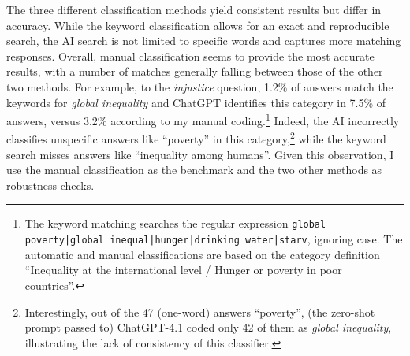 \documentclass[12pt,english]{article}
\makeatletter
\providecommand{\DIFaddtex}[1]{{\protect\color{blue}\uwave{#1}}} %
\providecommand{\DIFdeltex}[1]{{\protect\color{red}\sout{#1}}} %
\providecommand{\DIFaddbegin}{} %
\providecommand{\DIFaddend}{} %
\providecommand{\DIFdelbegin}{} %
\providecommand{\DIFdelend}{} %
\providecommand{\DIFadd}[1]{\texorpdfstring{\DIFaddtex{#1}}{#1}} %
\providecommand{\DIFdel}[1]{\texorpdfstring{\DIFdeltex{#1}}{}} %
\providecommand{\DIFscaledelfig}{0.5}
\newlength{\DIFdelgraphicswidth} %
\newlength{\DIFdelgraphicsheight} %
\providecommand{\DIFaddincludegraphics}[2][]{{\color{blue}\fbox{\DIFOincludegraphics[#1]{#2}}}} %
\providecommand{\DIFdelincludegraphics}[2][]{%
\sbox{\DIFdelgraphicsbox}{\DIFOincludegraphics[#1]{#2}}%
\settoboxwidth{\DIFdelgraphicswidth}{\DIFdelgraphicsbox} %
\settoboxtotalheight{\DIFdelgraphicsheight}{\DIFdelgraphicsbox} %
\scalebox{\DIFscaledelfig}{%
\parbox[b]{\DIFdelgraphicswidth}{\usebox{\DIFdelgraphicsbox}\\[-\baselineskip] \rule{\DIFdelgraphicswidth}{0em}}\llap{\resizebox{\DIFdelgraphicswidth}{\DIFdelgraphicsheight}{%
\setlength{\unitlength}{\DIFdelgraphicswidth}%
\begin{picture}(1,1)%
\thicklines\linethickness{2pt} %
{\color[rgb]{1,0,0}\put(0,0){\framebox(1,1){}}}%
{\color[rgb]{1,0,0}\put(0,0){\line( 1,1){1}}}%
{\color[rgb]{1,0,0}\put(0,1){\line(1,-1){1}}}%
\end{picture}%
}\hspace*{3pt}}} %
} %
\DeclareRobustCommand{\DIFaddbegin}{\DIFOaddbegin \let\includegraphics\DIFaddincludegraphics} %
\DeclareRobustCommand{\DIFaddend}{\DIFOaddend \let\includegraphics\DIFOincludegraphics} %
\DeclareRobustCommand{\DIFdelbegin}{\DIFOdelbegin \let\includegraphics\DIFdelincludegraphics} %
\DeclareRobustCommand{\DIFdelend}{\DIFOaddend \let\includegraphics\DIFOincludegraphics} %
\let\sout@orig\sout %
\renewcommand{\sout}[1]{\ifmmode\text{\sout@orig{\ensuremath{#1}}}\else\sout@orig{#1}\fi} %
\makeatother
\begin{document}
The three different classification methods yield consistent results but differ in accuracy. While the keyword classification allows for an exact and reproducible search, the AI search is not limited to specific words and captures more matching responses. %
Overall, manual classification seems to provide the most accurate results, with a number of matches generally falling between those of the other two methods. 
For example, \DIFdelbegin \DIFdel{to }\DIFdelend \DIFaddbegin \DIFadd{for }\DIFaddend the \textit{injustice} question, 1.2\% of answers match the keywords for \textit{global inequality} and ChatGPT identifies this category in 7.5\% of answers, versus 3.2\% according to my manual coding.\footnote{The keyword matching searches the regular expression \texttt{global poverty\allowbreak|global inequal\allowbreak|hunger|drinking water|starv}, ignoring case. The automatic and manual classifications are based on the category definition ``Inequality at the international %
level / Hunger or poverty in poor countries''.} 
Indeed, the AI incorrectly classifies unspecific answers like ``poverty'' in this category,\footnote{Interestingly, out of the 47  (one-word) answers ``poverty'', (the zero-shot prompt passed to) ChatGPT-4.1 coded only 42 of them as \textit{global inequality}, illustrating the lack of consistency of this classifier.} while the keyword search misses answers like ``inequality among humans''. 
Given this observation, I use the manual classification as the benchmark and the two other methods as robustness checks.
\end{document}
